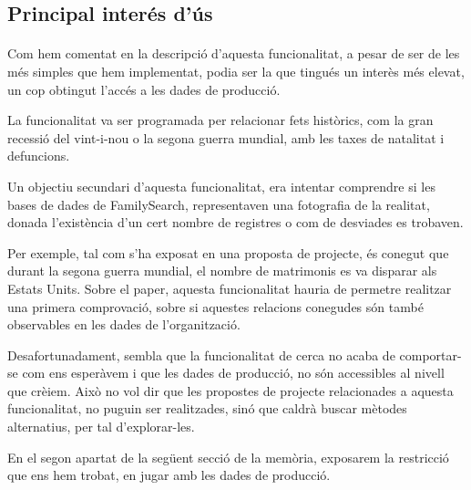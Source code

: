 \subsection{Principal interés d'ús}

    \paragraph{}
    Com hem comentat en la descripció d'aquesta funcionalitat, a pesar de ser de les més simples que hem implementat, podia ser la que tingués un interès més elevat, un cop obtingut l'accés a les dades de producció.

    La funcionalitat va ser programada per relacionar fets històrics, com la gran re\-cessió del vint-i-nou o la segona guerra mundial, amb les taxes de natalitat i defuncions.

    Un objectiu secundari d'aquesta funcionalitat, era intentar comprendre si les bases de dades de FamilySearch, representaven una fotografia de la realitat, donada l'existència d'un cert nombre de registres o com de desviades es trobaven.

    Per exemple, tal com s’ha exposat en una proposta de projecte, és conegut que durant la segona guerra mundial, el nombre de matrimonis es va disparar als Estats Units. Sobre el paper, aquesta funcionalitat hauria de permetre realitzar una primera comprovació, sobre si aquestes relacions conegudes són també observables en les dades de l'organització.

    Desafortunadament, sembla que la funcionalitat de cerca no acaba de comportar-se com ens esperàvem i que les dades de producció, no són accessibles al nivell que crèiem. Això no vol dir que les propostes de projecte relacionades a aquesta funcionalitat, no puguin ser realitzades, sinó que caldrà buscar mètodes alternatius, per tal d'explorar-les.

    En el segon apartat de la següent secció de la memòria, exposarem la restricció que ens hem trobat, en jugar amb les dades de producció.
